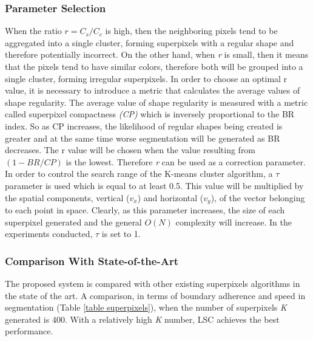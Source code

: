 \subsubsection{Parameter Selection}
When the ratio $ r = C_s / C_c $ is high, then the neighboring pixels tend to be 
aggregated into a single cluster, forming superpixels with a regular shape 
and therefore potentially incorrect. On the other hand, when \emph{r} is small, 
then it means that the pixels tend to have similar colors, therefore both 
will be grouped into a single cluster, forming irregular superpixels. In order to 
choose an optimal r value, it is necessary to introduce a metric that calculates 
the average  values of shape regularity. The average value of shape regularity 
is measured with a metric called superpixel compactness \emph{(CP)} \cite{0781426533} which is 
inversely proportional to the BR index. So as CP increases, the likelihood 
of regular shapes being created is greater and at the same time worse segmentation 
will be generated as BR decreases. The r value will be chosen 
when the value resulting from $ (1-BR / CP) $ is the lowest. Therefore \emph{r} can be 
used as a correction parameter. In order to control the search range of the 
K-means cluster algorithm, a $ \tau $ parameter is used which is equal to at least 
0.5. This value will be multiplied by the spatial components, vertical ($ v_x $) 
and horizontal ($ v_y $), of the vector belonging to each point in space. Clearly, 
as this parameter increases, the size of each superpixel generated and the 
general $ O(N) $ complexity will increase. In the experiments conducted, $ \tau $ is 
set to 1.

\subsubsection{Comparison With State-of-the-Art}
The proposed system is compared with other existing superpixels algorithms 
in the state of the art. A comparison, in terms of boundary adherence and 
speed in segmentation (Table \ref{table superpixels}), when the number of superpixels \emph{K} generated 
is 400. With a relatively high \emph{K} number, LSC achieves the best 
performance.

